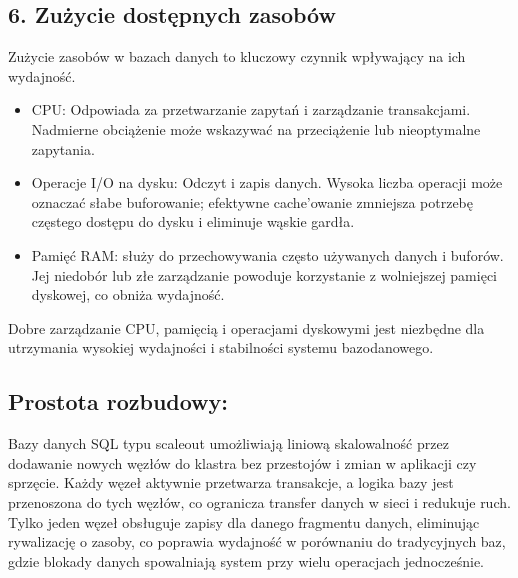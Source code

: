 \documentclass[a4paper,11pt,polish]{sphinxmanual}
\begin{document}
\subsection{6. Zużycie dostępnych zasobów}
\label{\detokenize{Wydajnosc-Skalowanie-i-Replikacja/index:zuzycie-dostepnych-zasobow}}
\sphinxAtStartPar
Zużycie zasobów w bazach danych to kluczowy czynnik wpływający na ich wydajność.
\begin{description}
\begin{itemize}
\item {} 
\sphinxAtStartPar
CPU: Odpowiada za przetwarzanie zapytań i zarządzanie transakcjami. Nadmierne obciążenie może wskazywać na przeciążenie lub nieoptymalne zapytania.

\item {} 
\sphinxAtStartPar
Operacje I/O na dysku: Odczyt i zapis danych. Wysoka liczba operacji może oznaczać słabe buforowanie; efektywne cache’owanie zmniejsza potrzebę częstego dostępu do dysku i eliminuje wąskie gardła.

\item {} 
\sphinxAtStartPar
Pamięć RAM: służy do przechowywania często używanych danych i buforów. Jej niedobór lub złe zarządzanie powoduje korzystanie z wolniejszej pamięci dyskowej, co obniża wydajność.

\end{itemize}

\end{description}

\sphinxAtStartPar
Dobre zarządzanie CPU, pamięcią i operacjami dyskowymi jest niezbędne dla utrzymania wysokiej wydajności i stabilności systemu bazodanowego.


\subsection{Prostota rozbudowy:}
\label{\detokenize{Wydajnosc-Skalowanie-i-Replikacja/index:prostota-rozbudowy}}
\sphinxAtStartPar
Bazy danych SQL typu scale\sphinxhyphen{}out umożliwiają liniową skalowalność przez dodawanie nowych węzłów do klastra bez przestojów i zmian w aplikacji czy sprzęcie. Każdy węzeł aktywnie przetwarza transakcje, a logika bazy jest przenoszona do tych węzłów, co ogranicza transfer danych w sieci i redukuje ruch. Tylko jeden węzeł obsługuje zapisy dla danego fragmentu danych, eliminując rywalizację o zasoby, co poprawia wydajność w porównaniu do tradycyjnych baz, gdzie blokady danych spowalniają system przy wielu operacjach jednocześnie.
\end{document}
